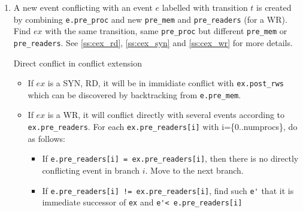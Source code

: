 \documentclass{llncs}
\begin{document}
\begin{enumerate}
\begin{algorithm}{}
\begin{enumerate}
			for each \verb!e.pre_readers[i]! $(i \in [0..numprocs])$,
			
			set \verb!parent = e.pre_readers[i]!
			
		\end{enumerate}
		Let's consider $parent$.
		
		\begin{itemize}
			\item
			\verb!parent->trans->type! is RD or SYN: 
			If found(e') in \verb!parent.post_rws!, then $e$ and $e'$ are in immediate
			conflict
			\item
			\verb!parent->trans->type! is WR: If found(e) and found(e') in the same 
			\verb!parent.post_mem[i]!, then they definitely
			conflict immediately.
		\end{itemize}
		\noindent
		\caption{Check direct conflict between two enabled events}
		\label{a:dicfl}
	\end{algorithm}
	
	\item
	A new event conflicting with an event $e$ labelled with transition $t$ is created by
	combining \verb!e.pre_proc! and new \verb!pre_mem! and \verb!pre_readers! (for a WR).
	Find $ex$ with the same transition, same \verb!pre_proc! but different \verb!pre_mem! or
	\verb!pre_readers!. See \cref{ss:cex_rd}, \cref{ss:cex_syn} and \cref{ss:cex_wr} for more
	details.
	
	\begin{lemma}{Direct conflict in conflict extension}
		\begin{itemize}
			\item
			If $ex$ is a SYN, RD, it will be in immidiate conflict with \verb!ex.post_rws! which can be discovered by backtracking from \verb!e.pre_mem!.
			\item
			If $ex$ is a WR, it will conflict directly with several events according to \verb|ex.pre_readers|. For each \verb|ex.pre_readers[i]| with i=\{0..numprocs\}, do as follows:
			\begin{itemize}
				\item 
					If \verb|e.pre_readers[i] = ex.pre_readers[i]|, then there is no directly conflicting event in branch $i$. Move to the next branch.
				\item
					If \verb|e.pre_readers[i] != ex.pre_readers[i]|, find such \verb|e'| that it is immediate successor of \verb|ex| and \verb|e'< e.pre_readers[i]|
			\end{itemize}
		\end{itemize}
	\end{lemma}
	
\end{enumerate}
\end{document}
